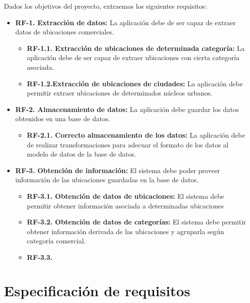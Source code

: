 Dados los objetivos del proyecto, extraemos los siguientes requisitos:

\begin{itemize}
	\item \textbf{RF-1. Extracción de datos:} La aplicación debe de ser capaz de extraer datos de ubicaciones comerciales.
		\begin{itemize}
			\item \textbf{RF-1.1. Extracción de ubicaciones de determinada categoría:} La aplicación debe de ser capaz de extraer ubicaciones con cierta categoría asociada.
			\item \textbf{RF-1.2.Extracción de ubicaciones de ciudades:} La aplicación debe permitir extraer ubicaciones de determinados núcleos urbanos.
		\end{itemize}
	\item \textbf{RF-2. Almacenamiento de datos:} La aplicación debe guardar los datos obtenidos en una base de datos.
		\begin{itemize}
			\item \textbf{RF-2.1. Correcto almacenamiento de los datos:} La aplicación debe de realizar transformaciones para adecuar el formato de los datos al modelo de datos de la base de datos.
		\end{itemize}
	\item \textbf{RF-3. Obtención de información:} El sistema debe poder proveer información de las ubicaciones guardadas en la base de datos.
		\begin{itemize}
			\item \textbf{RF-3.1. Obtención de datos de ubicaciones:} El sistema debe permitir obtener información asociada a determinadas ubicaciones
			\item \textbf{RF-3.2. Obtención de datos de categorías:} El sistema debe permitir obtener información derivada de las ubicaciones y agruparla según categoría comercial.
			\item \textbf{RF-3.3. }
		\end{itemize}
\end{itemize}


\section{Especificación de requisitos}
\begin{landscape}



\end{landscape}

